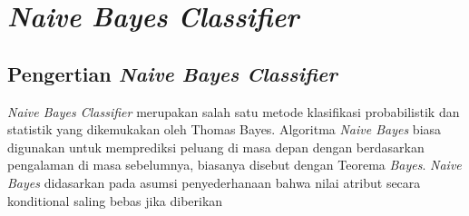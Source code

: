 \section{\textit{Naive Bayes Classifier}}
\subsection{Pengertian \textit{Naive Bayes Classifier}}
\textit{Naive Bayes Classifier} merupakan salah satu metode klasifikasi probabilistik dan statistik yang dikemukakan oleh Thomas Bayes. Algoritma \textit{Naive Bayes} biasa digunakan untuk memprediksi peluang di masa depan dengan berdasarkan pengalaman di masa sebelumnya, biasanya disebut dengan Teorema \textit{Bayes}. 
\textit{Naive Bayes} didasarkan pada asumsi penyederhanaan bahwa nilai atribut secara konditional saling bebas jika diberikan 
